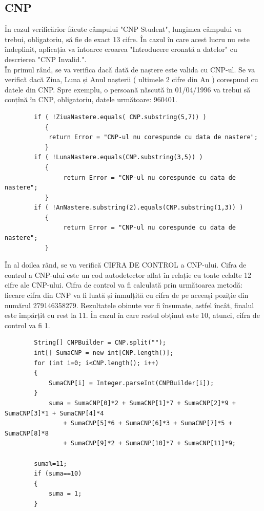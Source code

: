\documentclass{article}
\begin{document}
		\subsection*{CNP}
		În cazul verificărior făcute câmpului "CNP Student", lungimea câmpului va trebui, obligatoriu, să fie de exact 13 cifre. În cazul în care acest lucru nu este îndeplinit, aplicația va întoarce eroarea "Introducere eronată a datelor" cu descrierea "CNP Invalid.". \\

		În primul rând, se va verifica dacă dată de naștere este valida cu CNP-ul. Se va verifică dacă Ziua, Luna și Anul nașterii ( ultimele 2 cifre din An ) corespund cu datele din CNP. Spre exemplu, o persoană născută în 01/04/1996 va trebui să conțînă în CNP, obligatoriu, datele următoare: 960401.

	\begin{verbatim}
        if ( !ZiuaNastere.equals( CNP.substring(5,7)) )
           {
           	return Error = "CNP-ul nu corespunde cu data de nastere";
       	   }
        if ( !LunaNastere.equals(CNP.substring(3,5)) )
           {
            	return Error = "CNP-ul nu corespunde cu data de nastere";
           }
        if ( !AnNastere.substring(2).equals(CNP.substring(1,3)) )
           {
            	return Error = "CNP-ul nu corespunde cu data de nastere";
           }
	\end{verbatim}

		În al doilea rând, se va verifică CIFRA DE CONTROL a CNP-ului. Cifra de control a CNP-ului este un cod autodetector aflat în relație cu toate celalte 12 cifre ale CNP-ului. Cifra de control va fi calculată prin următoarea metodă: fiecare cifra din CNP va fi luată și înmulțită cu cifra de pe aceeași poziție din numărul 279146358279. Rezultatele obinute vor fi însumate, astfel încât, finalul este împărțit cu rest la 11. În cazul în care restul obținut este 10, atunci, cifra de control va fi 1.

	\begin{verbatim}
        String[] CNPBuilder = CNP.split("");
        int[] SumaCNP = new int[CNP.length()];
        for (int i=0; i<CNP.length(); i++)
        {
            SumaCNP[i] = Integer.parseInt(CNPBuilder[i]);
        }
	        suma = SumaCNP[0]*2 + SumaCNP[1]*7 + SumaCNP[2]*9 + SumaCNP[3]*1 + SumaCNP[4]*4 
                + SumaCNP[5]*6 + SumaCNP[6]*3 + SumaCNP[7]*5 + SumaCNP[8]*8
                + SumaCNP[9]*2 + SumaCNP[10]*7 + SumaCNP[11]*9;

        suma%=11;
        if (suma==10)
        {
            suma = 1;
        }
	\end{verbatim}
\end{document}
